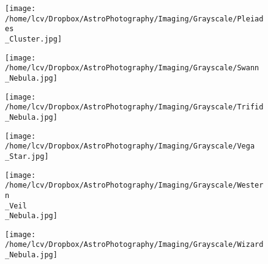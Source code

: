 \newpage
\begin{figure}[phbt]
	\texttt{[image: /home/lcv/Dropbox/AstroPhotography/Imaging/Grayscale/Pleiades\\\_Cluster.jpg]}


\end{figure}
\newpage
\begin{figure}[phbt]
	\texttt{[image: /home/lcv/Dropbox/AstroPhotography/Imaging/Grayscale/Swann\\\_Nebula.jpg]}


\end{figure}
\newpage
\begin{figure}[phbt]
	\texttt{[image: /home/lcv/Dropbox/AstroPhotography/Imaging/Grayscale/Trifid\\\_Nebula.jpg]}


\end{figure}
\newpage
\begin{figure}[phbt]
	\texttt{[image: /home/lcv/Dropbox/AstroPhotography/Imaging/Grayscale/Vega\\\_Star.jpg]}


\end{figure}
\newpage
\begin{figure}[phbt]
	\texttt{[image: /home/lcv/Dropbox/AstroPhotography/Imaging/Grayscale/Western\\\_Veil\\\_Nebula.jpg]}


\end{figure}
\newpage
\begin{figure}[phbt]
	\texttt{[image: /home/lcv/Dropbox/AstroPhotography/Imaging/Grayscale/Wizard\\\_Nebula.jpg]}


\end{figure}
\newpage
